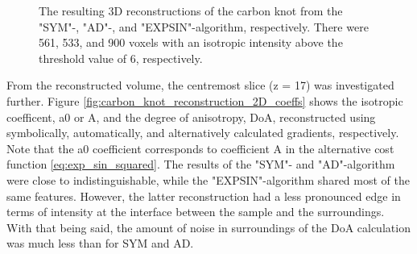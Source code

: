 \begin{figure}[h!]
    

    \caption{ The resulting 3D reconstructions of the carbon knot from the "SYM"-, "AD"-, and "EXPSIN"-algorithm, respectively.
        There were 561, 533, and 900 voxels with an isotropic intensity above the threshold value of 6, respectively.
    }
    \label{fig:carbon_knot_reconstruction_3D}
\end{figure}

\clearpage

From the reconstructed volume, the centremost slice (z = 17) was investigated further.
Figure \ref{fig:carbon_knot_reconstruction_2D_coeffs} shows the isotropic coefficent, a0 or A, and the degree of anisotropy, DoA, reconstructed using symbolically, automatically, and alternatively calculated gradients, respectively.
Note that the a0 coefficient corresponds to coefficient A in the alternative cost function \eqref{eq:exp_sin_squared}.
The results of the "SYM"- and "AD"-algorithm were close to indistinguishable,
while the "EXPSIN"-algorithm shared most of the same features.
However, the latter reconstruction had a less pronounced edge in terms of intensity at the interface between the sample and the surroundings.
With that being said, the amount of noise in surroundings of the DoA calculation was much less than for SYM and AD.

